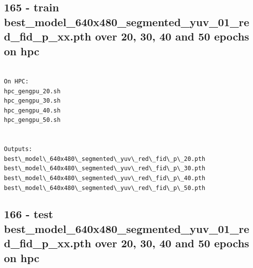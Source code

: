 \subsection{165 - train best\_model\_640x480\_segmented\_yuv\_01\_red\_fid\_p\_xx.pth over 20, 30, 40 and 50 epochs on hpc}
\label{app_res:165}

\begin{verbatim}

On HPC:
hpc_gengpu_20.sh
hpc_gengpu_30.sh
hpc_gengpu_40.sh
hpc_gengpu_50.sh


Outputs:
best\_model\_640x480\_segmented\_yuv\_red\_fid\_p\_20.pth
best\_model\_640x480\_segmented\_yuv\_red\_fid\_p\_30.pth
best\_model\_640x480\_segmented\_yuv\_red\_fid\_p\_40.pth
best\_model\_640x480\_segmented\_yuv\_red\_fid\_p\_50.pth
\end{verbatim}

\subsection{166 - test best\_model\_640x480\_segmented\_yuv\_01\_red\_fid\_p\_xx.pth over 20, 30, 40 and 50 epochs on hpc}
\label{app_res:166}

